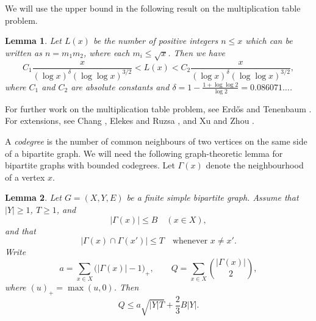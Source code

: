 \documentclass[12pt,a4paper,reqno]{amsart}
\numberwithin{equation}{section}
\theoremstyle{plain}
\newtheorem{lemma}{Lemma}
\theoremstyle{definition}
\begin{document}
We will use the upper bound in the following result \cite[Corollary 3]{Ford} on the multiplication table problem.
\begin{lemma}\label{Lemma-table}
Let $L(x)$ be the number of positive integers $n\le x$ which can
be written as $n=m_1m_2$, where each $m_i\le \sqrt{x}$. Then we have
$$
C_1\frac{x}{(\log x)^\delta(\log\log x)^{3/2}}<L(x)<C_2 \frac{x}{(\log x)^\delta(\log\log x)^{3/2}} ,
$$
where $C_1$ and $C_2$ are absolute constants and $\delta=1-\frac{1+\log\log 2}{\log 2}=0.086071\ldots$.
\end{lemma}
For further work on the multiplication table problem, see Erd\H os \cite{Erdos-New} and Tenenbaum \cite{Tenenbaum}. For extensions, see Chang \cite{Chang}, Elekes and Ruzsa \cite{Elekes-Ruzsa}, and Xu and Zhou \cite{Xu-Zhou}.

A \emph{codegree} is the number of common neighbours of two vertices on the same side of a bipartite graph. 
We will need the following graph-theoretic lemma for bipartite graphs with bounded codegrees. Let $\Gamma(x)$ denote the neighbourhood of a vertex $x$.
\begin{lemma}\label{lem:graph}
Let \(G=(X,Y,E)\) be a finite simple bipartite graph.  
Assume that \(|Y|\ge1\), \(T\ge1\), and
\[
 |\Gamma(x)|\le B\quad(x\in X),
\]
and that
\[
 |\Gamma(x)\cap\Gamma(x')|\le T
 \quad\text{whenever }x\ne x'.
\]
Write
\[
 a=\sum_{x\in X}\big(|\Gamma(x)|-1\big)_+,
 \qquad
 Q=\sum_{x\in X}\binom{|\Gamma(x)|}2,
\]
where \((u)_+=\max(u,0)\).  Then
\begin{equation}\label{eq:graph-lemma}
 Q\le a\sqrt{|Y|T}+\frac23B|Y|.
\end{equation}
\end{lemma}
\end{document}
